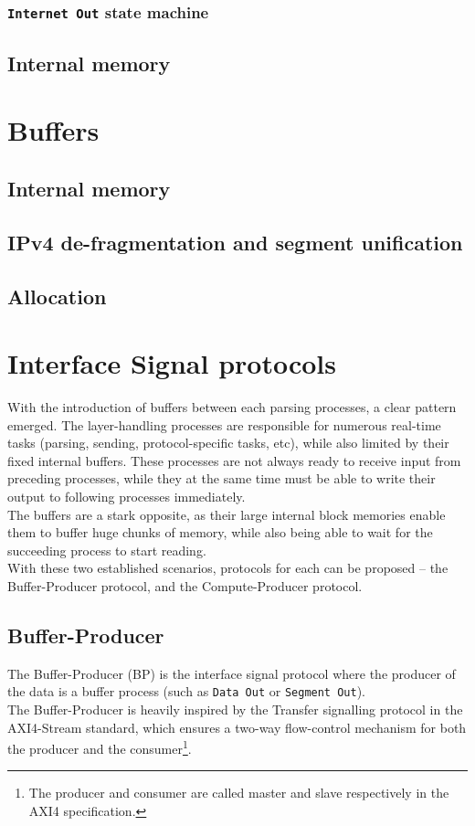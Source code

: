 \subsubsection{\texttt{Internet Out} state machine}


\subsection{Internal memory}


\section{Buffers}
\subsection{Internal memory}
\subsection{IPv4 de-fragmentation and segment unification}
\subsection{Allocation}


\section{Interface Signal protocols}
\label{sec:interface_signal_protocol}
With the introduction of buffers between each parsing processes, a clear pattern
emerged. The layer-handling processes are responsible for numerous real-time tasks
(parsing, sending, protocol-specific tasks, etc), while also limited by their
fixed internal buffers. These processes are not always ready to receive input
from preceding processes, while they at the same time must be able to write their
output to following processes immediately.\\
The buffers are a stark opposite, as their large internal block memories enable
them to buffer huge chunks of memory, while also being able to wait for the
succeeding process to start reading.\\
With these two established scenarios, protocols for each can be proposed -- the
Buffer-Producer protocol, and the Compute-Producer protocol.

\subsection{Buffer-Producer}
The Buffer-Producer (BP) is the interface signal protocol where the producer of
the data is a buffer process (such as \texttt{Data Out} or \texttt{Segment
Out}).\\
The Buffer-Producer is heavily inspired by the Transfer signalling protocol in
the AXI4-Stream standard, which ensures a two-way flow-control mechanism for both
the producer and the consumer\footnote{The producer and consumer are called
master and slave respectively in the AXI4 specification.}\cite{arm_axi4}.

